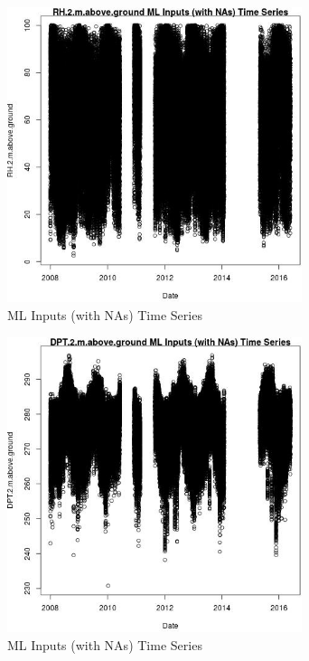 \begin{figure} 
\centering  
\includegraphics[width=0.77\textwidth]{Code_Outputs/Report_ML_input_PM25_Step4_part_e_de_duplicated_aveswNAs_RH2mabovegroundvDate.jpg} 
\caption{\label{fig:Report_ML_input_PM25_Step4_part_e_de_duplicated_aveswNAsRH2mabovegroundvDate}ML Inputs (with NAs) Time Series} 
\end{figure} 
 

\begin{figure} 
\centering  
\includegraphics[width=0.77\textwidth]{Code_Outputs/Report_ML_input_PM25_Step4_part_e_de_duplicated_aveswNAs_DPT2mabovegroundvDate.jpg} 
\caption{\label{fig:Report_ML_input_PM25_Step4_part_e_de_duplicated_aveswNAsDPT2mabovegroundvDate}ML Inputs (with NAs) Time Series} 
\end{figure} 
 

